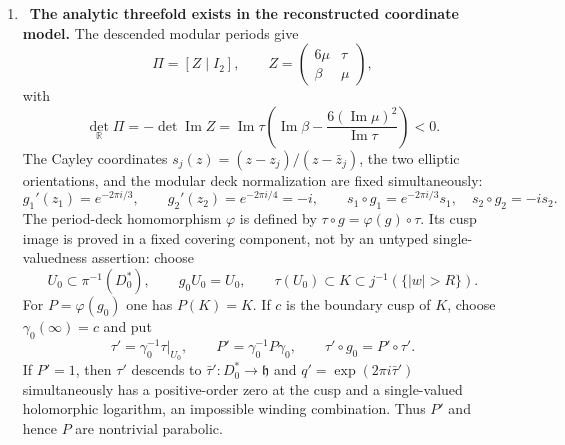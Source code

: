 \begin{enumerate}[leftmargin=1.8em,itemsep=.65em]
\item \Verified\ \textbf{The analytic threefold exists in the reconstructed
coordinate model.}
The descended modular periods give
\[
 \Pi=[Z\mid I_2],\qquad
 Z=\begin{pmatrix}6\mu&\tau\\\beta&\mu\end{pmatrix},
\]
with
\[
 \det_{\mathbb R}\Pi
 =-\det\operatorname{Im}Z
 =\operatorname{Im}\tau
 \left(\operatorname{Im}\beta-
 \frac{6(\operatorname{Im}\mu)^2}{\operatorname{Im}\tau}\right)<0.
\]
The Cayley coordinates
\(s_j(z)=(z-z_j)/(z-\bar z_j)\), the two elliptic orientations, and the
modular deck normalization are fixed simultaneously:
\[
 g_1'(z_1)=e^{-2\pi i/3},\qquad g_2'(z_2)=e^{-2\pi i/4}=-i,
 \qquad
 s_1\circ g_1=e^{-2\pi i/3}s_1,\quad s_2\circ g_2=-is_2.
\]
The period-deck homomorphism $\varphi$ is defined by
$\tau\circ g=\varphi(g)\circ\tau$.  Its cusp image is proved in a fixed
covering component, not by an untyped single-valuedness assertion: choose
\[
 U_0\subset\pi^{-1}(D_0^*),\qquad g_0U_0=U_0,\qquad
 \tau(U_0)\subset K\subset j^{-1}(\{|w|>R\}).
\]
For $P=\varphi(g_0)$ one has $P(K)=K$.  If $c$ is the boundary cusp of
$K$, choose $\gamma_0(\infty)=c$ and put
\[
 \tau'=\gamma_0^{-1}\tau|_{U_0},\qquad
 P'=\gamma_0^{-1}P\gamma_0,\qquad
 \tau'\circ g_0=P'\circ\tau'.
\]
If $P'=1$, then $\tau'$ descends to
$\bar\tau':D_0^*\to\mathfrak h$ and
$q'=\exp(2\pi i\bar\tau')$ simultaneously has a positive-order zero at the
cusp and a single-valued holomorphic logarithm, an impossible winding
combination.  Thus $P'$ and hence $P$ are nontrivial parabolic.


\end{enumerate}
